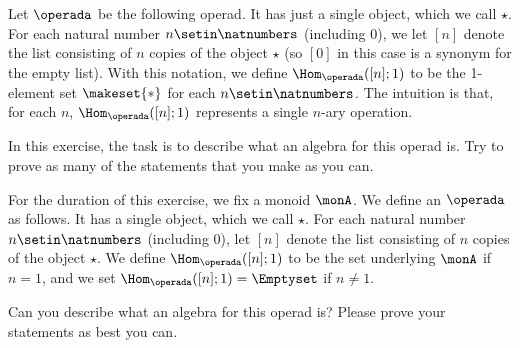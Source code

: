 
\begin{gradedexercise}
    \label{ex:MonoidsAsAlgebras}
    Let $\operada$ be the following operad.
    It has just a single object, which we call $\star$.
    For each natural number $n \setin \natnumbers$ (including $0$), we let $[n]$ denote the list consisting of $n$ copies of the object $\star$ (so $[0]$ in this case is a synonym for the empty list).
    With this notation, we define $\Hom_\operada([n];1)$ to be the 1-element set $\makeset{ * }$ for each $n \setin \natnumbers$.
    The intuition is that, for each $n$, $\Hom_\operada([n];1)$ represents a single $n$-ary operation.

    In this exercise, the task is to describe what an algebra for this operad is.
    Try to prove as many of the statements that you make as you can.
\end{gradedexercise}



\begin{gradedexercise}
    \label{ex:MonoidsActionsAsAlgebras}
    For the duration of this exercise, we fix a monoid $\monA$.
    We define an $\operada$ as follows.
    It has a single object, which we call $\star$.
    For each natural number $n \setin \natnumbers$ (including $0$), let $[n]$ denote the list consisting of $n$ copies of the object $\star$.
    We define $\Hom_\operada([n];1)$ to be the set underlying $\monA$ if $n =1$, and we set $\Hom_\operada([n];1) = \Emptyset$ if $n \neq 1$.

    Can you describe what an algebra for this operad is?
    Please prove your statements as best you can.
\end{gradedexercise}



\showslides{
    \begin{forslides}
        \begin{equation*}
            \label{eq:composition_operad}
            [\mora,\morb]\mthen \morc
        \end{equation*}
    \end{forslides}

}

